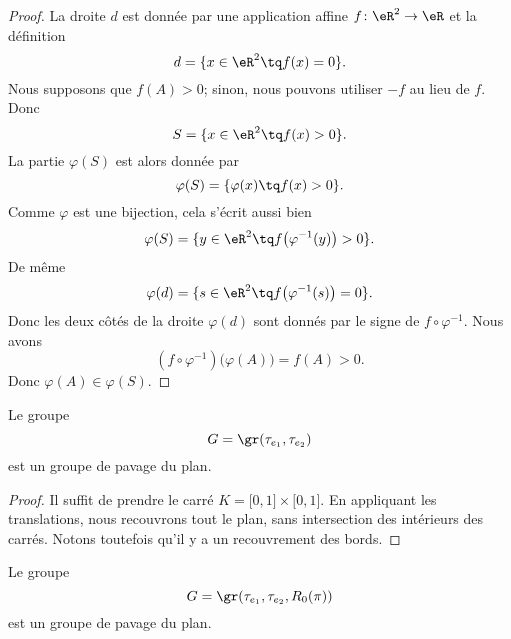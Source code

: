 \begin{proof}
	La droite \( d\) est donnée par une application affine \( f\colon \eR^2\to \eR\) et la définition
	\begin{equation}
		d=\{ x\in \eR^2\tq f(x)=0 \}.
	\end{equation}
	Nous supposons que \( f(A)>0\); sinon, nous pouvons utiliser \( -f\) au lieu de \( f\). Donc
	\begin{equation}
		S=\{ x\in \eR^2\tq f(x)>0 \}.
	\end{equation}
	La partie \( \varphi(S)\) est alors donnée par
	\begin{equation}
		\varphi(S)=\{ \varphi(x)\tq f(x)>0 \}.
	\end{equation}
	Comme \( \varphi\) est une bijection, cela s'écrit aussi bien
	\begin{equation}
		\varphi(S)=\{ y\in \eR^2\tq f\big( \varphi^{-1}(y) \big)>0 \}.
	\end{equation}
	De même
	\begin{equation}
		\varphi(d)=\{ s\in \eR^2\tq f\big( \varphi^{-1}(s) \big)=0 \}.
	\end{equation}
	Donc les deux côtés de la droite \( \varphi(d)\) sont donnés par le signe de \( f\circ \varphi^{-1}\). Nous avons
	\begin{equation}
		(f\circ\varphi^{-1})\big( \varphi(A) \big)=f(A)>0.
	\end{equation}
	Donc \( \varphi(A)\in \varphi(S)\).
\end{proof}

\begin{lemma}           \label{LEMooZOXVooTJiLTF}
	Le groupe
	\begin{equation}
		G=\gr(\tau_{e_1}, \tau_{e_2})
	\end{equation}
	est un groupe de pavage du plan.
\end{lemma}

\begin{proof}
	Il suffit de prendre le carré \( K=\mathopen[ 0 , 1 \mathclose]\times \mathopen[ 0 , 1 \mathclose]\). En appliquant les translations, nous recouvrons tout le plan, sans intersection des intérieurs des carrés. Notons toutefois qu'il y a un recouvrement des bords.
\end{proof}

\begin{lemma}    \label{LEMooTMRGooChBzZg}
	Le groupe
	\begin{equation}
		G=\gr(\tau_{e_1}, \tau_{e_2}, R_0(\pi))
	\end{equation}
	est un groupe de pavage du plan.
\end{lemma}

